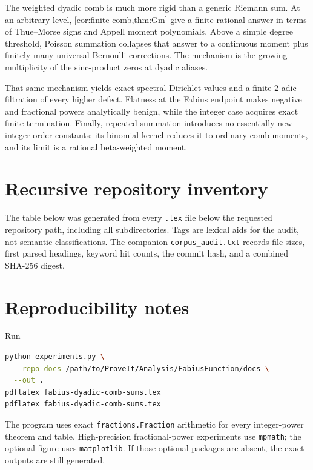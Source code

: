 \documentclass[11pt]{article}
\theoremstyle{definition}
\theoremstyle{remark}
\begin{document}
The weighted dyadic comb is much more rigid than a generic Riemann sum.  At an
arbitrary level, \cref{cor:finite-comb,thm:Gm} give a finite rational answer in
terms of Thue--Morse signs and Appell moment polynomials.  Above a simple
degree threshold, Poisson summation collapses that answer to a continuous
moment plus finitely many universal Bernoulli corrections.  The mechanism is
the growing multiplicity of the sinc-product zeros at dyadic aliases.

That same mechanism yields exact spectral Dirichlet values and a finite
$2$-adic filtration of every higher defect.  Flatness at the Fabius endpoint
makes negative and fractional powers analytically benign, while the integer
case acquires exact finite termination.  Finally, repeated summation introduces
no essentially new integer-order constants: its binomial kernel reduces it to
ordinary comb moments, and its limit is a rational beta-weighted moment.

\appendix
\section{Recursive repository inventory}\label{app:corpus}

The table below was generated from every \texttt{.tex} file below the requested
repository path, including all subdirectories.  Tags are lexical aids for the
audit, not semantic classifications.  The companion
\texttt{corpus\_audit.txt} records file sizes, first parsed headings, keyword
hit counts, the commit hash, and a combined SHA-256 digest.



\section{Reproducibility notes}

Run
\begin{lstlisting}[language=bash,basicstyle=\ttfamily\small,breaklines=true]
python experiments.py \
  --repo-docs /path/to/ProveIt/Analysis/FabiusFunction/docs \
  --out .
pdflatex fabius-dyadic-comb-sums.tex
pdflatex fabius-dyadic-comb-sums.tex
\end{lstlisting}
The program uses exact \texttt{fractions.Fraction} arithmetic for every
integer-power theorem and table.  High-precision fractional-power experiments
use \texttt{mpmath}; the optional figure uses \texttt{matplotlib}.  If those
optional packages are absent, the exact outputs are still generated.
\end{document}
